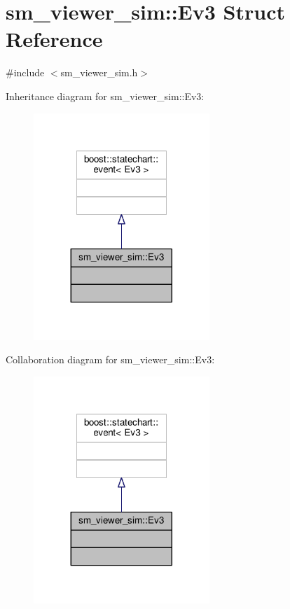 \hypertarget{structsm__viewer__sim_1_1Ev3}{}\section{sm\+\_\+viewer\+\_\+sim\+:\+:Ev3 Struct Reference}
\label{structsm__viewer__sim_1_1Ev3}


{\ttfamily \#include $<$sm\+\_\+viewer\+\_\+sim.\+h$>$}



Inheritance diagram for sm\+\_\+viewer\+\_\+sim\+:\+:Ev3\+:\nopagebreak
\begin{figure}[H]
\begin{center}
\leavevmode
\includegraphics[width=188pt]{structsm__viewer__sim_1_1Ev3__inherit__graph}
\end{center}
\end{figure}


Collaboration diagram for sm\+\_\+viewer\+\_\+sim\+:\+:Ev3\+:\nopagebreak
\begin{figure}[H]
\begin{center}
\leavevmode
\includegraphics[width=188pt]{structsm__viewer__sim_1_1Ev3__coll__graph}
\end{center}
\end{figure}



